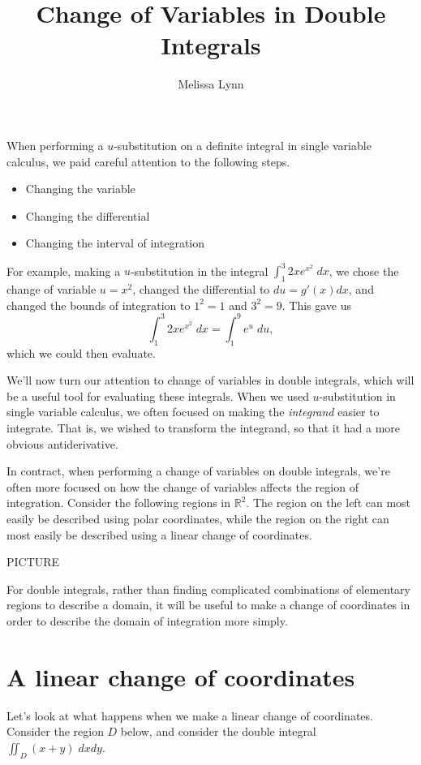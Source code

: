 \documentclass{ximera}
\title{Change of Variables in Double Integrals}
\author{Melissa Lynn}
\begin{document}
  
\begin{abstract}  
\end{abstract}  
\maketitle  

When performing a $u$-substitution on a definite integral in single variable calculus, we paid careful attention to the following steps.
\begin{itemize}
\item Changing the variable
\item Changing the differential
\item Changing the interval of integration
\end{itemize}
For example, making a $u$-substitution in the integral $\int_1^3 2x e^{x^2}\;dx$, we chose the change of variable $u=x^2$, changed the differential to $du = g'(x)dx$, and changed the bounds of integration to $1^2 = 1$ and $3^2 = 9$. This gave us
\[
\int_1^3 2x e^{x^2}\;dx = \int_1^9 e^u\;du,
\]
which we could then evaluate.

We'll now turn our attention to change of variables in double integrals, which will be a useful tool for evaluating these integrals. When we used $u$-substitution in single variable calculus, we often focused on making the \emph{integrand} easier to integrate. That is, we wished to transform the integrand, so that it had a more obvious antiderivative.

In contract, when performing a change of variables on double integrals, we're often more focused on how the change of variables affects the region of integration. Consider the following regions in $\mathbb{R}^2$. The region on the left can most easily be described using polar coordinates, while the region on the right can most easily be described using a linear change of coordinates.

PICTURE

For double integrals, rather than finding complicated combinations of elementary regions to describe a domain, it will be useful to make a change of coordinates in order to describe the domain of integration more simply.

\section*{A linear change of coordinates}

Let's look at what happens when we make a linear change of coordinates. Consider the region $D$ below, and consider the double integral $\iint_D (x+y)\;dxdy$.
\end{document}
